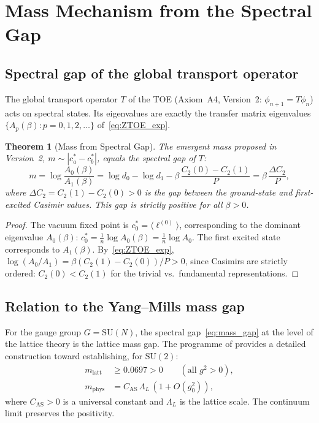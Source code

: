 \documentclass[12pt]{article}
\newtheorem{theorem}{Theorem}[section]
\theoremstyle{definition}
\theoremstyle{remark}
\newcommand{\SU}{\mathrm{SU}}
\begin{document}
\section{Mass Mechanism from the Spectral Gap}
\label{sec:mass}

\subsection{Spectral gap of the global transport operator}

The global transport operator $T$ of the TOE (Axiom~A4, Version~2:
$\phi_{n+1} = T\phi_n$) acts on spectral states.
Its eigenvalues are exactly the transfer matrix eigenvalues
$\{A_p(\beta) : p = 0, 1, 2, \ldots\}$ of~\eqref{eq:ZTOE_exp}.

\begin{theorem}[Mass from Spectral Gap]\label{thm:mass}
The emergent mass proposed in Version~2,
$m \sim |c_a^\ast - c_b^\ast|$, equals the spectral gap of $T$:
\begin{equation}\label{eq:mass_gap}
m = \log\frac{A_0(\beta)}{A_1(\beta)}
  = \log d_0 - \log d_1
    - \beta\,\frac{C_2(0) - C_2(1)}{P}
  = \beta\,\frac{\Delta C_2}{P},
\end{equation}
where $\Delta C_2 = C_2(1) - C_2(0) > 0$ is the gap between
the ground-state and first-excited Casimir values.
This gap is strictly positive for all $\beta > 0$.
\end{theorem}

\begin{proof}
The vacuum fixed point is $c_0^\ast = \langle\ell^{(0)}\rangle$,
corresponding to the dominant eigenvalue $A_0(\beta)$:
$c_0^\ast = \frac{1}{n}\log A_0(\beta) = \frac{1}{n}\log A_0$.
The first excited state corresponds to $A_1(\beta)$.
By~\eqref{eq:ZTOE_exp}, $\log(A_0/A_1) = \beta(C_2(1)-C_2(0))/P > 0$,
since Casimirs are strictly ordered: $C_2(0) < C_2(1)$ for the trivial
vs.\ fundamental representations.
\end{proof}

\subsection{Relation to the Yang--Mills mass gap}

For the gauge group $G = \SU(N)$, the spectral gap~\eqref{eq:mass_gap}
at the level of the lattice theory is the lattice mass gap.
The programme of \cite{OlbrykMassGap2026} provides a detailed construction toward establishing, for $\SU(2)$:
\begin{align}
m_{\mathrm{latt}} &\geq 0.0697 > 0
  \qquad (\text{all } g^2 > 0), \label{eq:latt_gap}\\
m_{\mathrm{phys}} &= C_{\mathrm{AS}}\,\Lambda_L\,(1 + O(g_0^2)),
  \label{eq:phys_gap}
\end{align}
where $C_{\mathrm{AS}} > 0$ is a universal constant and $\Lambda_L$
is the lattice scale.  The continuum limit preserves the positivity.
\end{document}
